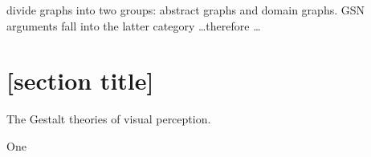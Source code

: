 \documentclass[authoryearcitations]{UoYCSproject}
\begin{document}
\citet{huang2007effects} divide graphs into two groups: abstract graphs and domain graphs. GSN arguments fall into the latter category \ldots therefore \ldots


\section{[section title]}


The Gestalt theories of visual perception.




One 



\end{document}

